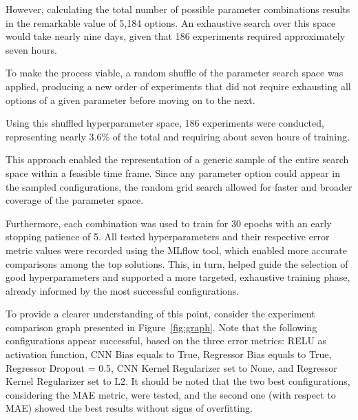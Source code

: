 \documentclass[10pt,conference]{IEEEtran}
\begin{document}
However, calculating the total number of possible parameter combinations results in the remarkable value of 5,184 options. An exhaustive search over this space would take nearly nine days, given that 186 experiments required approximately seven hours.

To make the process viable, a random shuffle of the parameter search space was applied, producing a new order of experiments that did not require exhausting all options of a given parameter before moving on to the next.

Using this shuffled hyperparameter space, 186 experiments were conducted, representing nearly 3.6\% of the total and requiring about seven hours of training.

This approach enabled the representation of a generic sample of the entire search space within a feasible time frame. Since any parameter option could appear in the sampled configurations, the random grid search allowed for faster and broader coverage of the parameter space.

Furthermore, each combination was used to train for 30 epochs with an early stopping patience of 5. All tested hyperparameters and their respective error metric values were recorded using the MLflow tool, which enabled more accurate comparisons among the top solutions. This, in turn, helped guide the selection of good hyperparameters and supported a more targeted, exhaustive training phase, already informed by the most successful configurations.

To provide a clearer understanding of this point, consider the experiment comparison graph presented in Figure~\ref{fig:graph}. Note that the following configurations appear successful, based on the three error metrics: RELU as activation function, CNN Bias equals to True, Regressor Bias equals to True, Regressor Dropout = 0.5, CNN Kernel Regularizer set to None, and Regressor Kernel Regularizer set to L2. It should be noted that the two best configurations, considering the MAE metric, were tested, and the second one (with respect to MAE) showed the best results without signs of overfitting.

\end{document}
